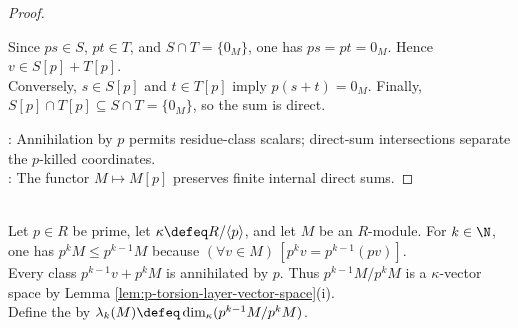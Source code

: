 \begin{lemma}
\begin{proof}
\begin{enumerate}[label=(\roman*)]
Since $ps\in S$, $pt\in T$, and $S\cap T=\{0_M\}$, one has $ps=pt=0_M$. Hence $v\in S[p]+T[p]$.\\
Conversely, $s\in S[p]$ and $t\in T[p]$ imply $p(s+t)=0_M$. Finally, $S[p]\cap T[p]\subseteq S\cap T=\{0_M\}$, so the sum is direct.
\end{enumerate}
: Annihilation by $p$ permits residue-class scalars; direct-sum intersections separate the $p$-killed coordinates.\\
: The functor $M\mapsto M[p]$ preserves finite internal direct sums.
\end{proof}
\end{lemma}

\begin{definition} \label{def:p-primary-layer-dimensions} \\
Let $p\in R$ be prime, let $\kappa\defeq R/\langle p\rangle$, and let $M$ be an $R$-module. For $k\in\N$, one has $p^kM\leq p^{k-1}M$ because $(\forall v\in M)\,[p^kv=p^{k-1}(pv)]$.\\
Every class $p^{k-1}v+p^kM$ is annihilated by $p$. Thus $p^{k-1}M/p^kM$ is a $\kappa$-vector space by Lemma \ref{lem:p-torsion-layer-vector-space}(i).\\
Define the  by $\lambda_k(M)\defeq\dim_{\kappa}(p^{k-1}M/p^kM)$.
\end{definition}

